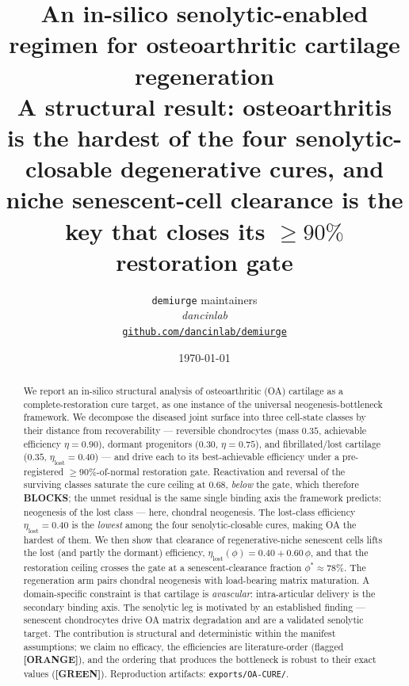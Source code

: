 \documentclass[11pt,a4paper]{article}
\title{
  \textbf{An in-silico senolytic-enabled regimen for osteoarthritic
  cartilage regeneration}\\[4pt]
  \large A structural result: osteoarthritis is the hardest of the four
  senolytic-closable degenerative cures, and niche senescent-cell clearance
  is the key that closes its $\geq 90\%$ restoration gate
}
\author{
  \texttt{demiurge} maintainers\\
  \normalsize\textit{dancinlab}\\[2pt]
  \normalsize\href{https://github.com/dancinlab/demiurge}{\texttt{github.com/dancinlab/demiurge}}
}
\date{\today}
\newcommand{\tierbadge}[2]{\textcolor{#1}{\textbf{[#2]}}}
\providecommand{\tierGreen}{\tierbadge{green!45!black}{GREEN}}
\providecommand{\tierOrange}{\tierbadge{orange!80!black}{ORANGE}}
\begin{document}
\maketitle

\begin{abstract}
We report an in-silico structural analysis of osteoarthritic (OA) cartilage as a
complete-restoration cure target, as one instance of the universal
neogenesis-bottleneck framework. We decompose the diseased joint surface into three
cell-state classes by their distance from recoverability --- reversible chondrocytes
(mass $0.35$, achievable efficiency $\eta=0.90$), dormant progenitors ($0.30$,
$\eta=0.75$), and fibrillated/lost cartilage ($0.35$, $\eta_{\text{lost}}=0.40$) --- and
drive each to its best-achievable efficiency under a pre-registered $\geq 90\%$-of-normal
restoration gate. Reactivation and reversal of the surviving classes saturate the cure
ceiling at $0.68$, \emph{below} the gate, which therefore \textbf{BLOCKS}; the unmet
residual is the same single binding axis the framework predicts: neogenesis of the lost
class --- here, chondral neogenesis. The lost-class efficiency $\eta_{\text{lost}}=0.40$
is the \emph{lowest} among the four senolytic-closable cures, making OA the hardest of
them. We then show that clearance of regenerative-niche senescent cells lifts the lost
(and partly the dormant) efficiency, $\eta_{\text{lost}}(\phi)=0.40+0.60\,\phi$, and that
the restoration ceiling crosses the gate at a senescent-clearance fraction
$\phi^\ast\!\approx\!78\%$. The regeneration arm pairs chondral neogenesis with
load-bearing matrix maturation. A domain-specific constraint is that cartilage is
\emph{avascular}: intra-articular delivery is the secondary binding axis. The senolytic
leg is motivated by an established finding --- senescent chondrocytes drive OA matrix
degradation and are a validated senolytic target. The contribution is structural and
deterministic within the manifest assumptions; we claim no efficacy, the efficiencies
are literature-order (flagged \tierOrange), and the ordering that produces the
bottleneck is robust to their exact values (\tierGreen). Reproduction artifacts:
\texttt{exports/OA-CURE/}.
\end{abstract}
\end{document}
